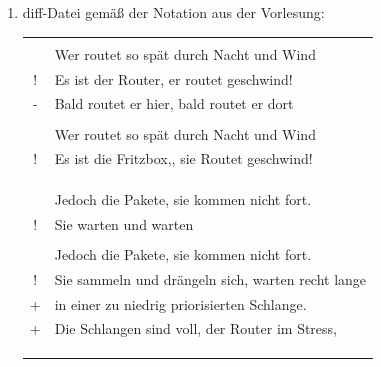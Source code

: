 \documentclass[11pt, a4paper]{article}
\title{}
\author{Felix Clajus}
\begin{document}
    \section{}
        \begin{enumerate}
            \item
                diff-Datei gemäß der Notation aus der Vorlesung:
                \begin{center}
                    \begin{tabularx}{0.9\textwidth}{|>{\hsize}CL|}
                        \hline
                        \\
                        & Wer routet so spät durch Nacht und Wind\\
                        ! & Es ist der Router, er routet geschwind!\\
                        - & Bald routet er hier, bald routet er dort\\
                        \\
                        & Wer routet so spät durch Nacht und Wind\\
                        ! & Es ist die Fritzbox,, sie Routet geschwind!\\
                        \\
                        &\\
                        \\
                        & Jedoch die Pakete, sie kommen nicht fort.\\
                        ! & Sie warten und warten\\
                        \\
                        & Jedoch die Pakete, sie kommen nicht fort.\\
                        ! & Sie sammeln und drängeln sich, warten recht lange \\
                        + & in einer zu niedrig priorisierten Schlange.\\
                        + & Die Schlangen sind voll, der Router im Stress, \\
                        \\
                        &\\
                        \\

\end{tabularx}
\end{center}
\end{enumerate}
\end{document}
